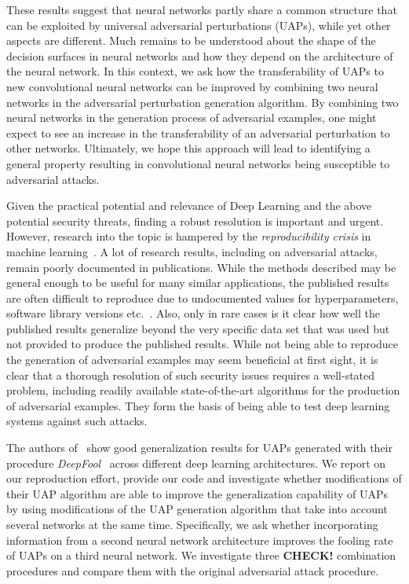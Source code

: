 \documentclass[runningheads]{llncs}
\begin{document}
These results suggest that neural networks partly share a common structure that can be exploited by universal adversarial perturbations (UAPs), while yet other aspects are different. Much remains to be understood about the shape of the decision surfaces in neural networks and how they depend on the architecture of the neural network. In this context, we ask how the transferability of UAPs to new convolutional neural networks can be improved by combining two neural networks in the adversarial perturbation generation algorithm. By combining two neural networks in the generation process of adversarial examples, one might expect to see an increase in the transferability of an adversarial perturbation to other networks. Ultimately, we hope this approach will lead to identifying a general property resulting in convolutional neural networks being susceptible to adversarial attacks.

Given the practical potential and relevance of Deep Learning and the above potential security threats, finding a robust resolution is important and urgent. However, research into the topic is hampered by the \emph{reproducibility crisis} in machine learning~\cite{raff2020quantifying}. A lot of research results, including on adversarial attacks, remain poorly documented in publications. While the methods described may be general enough to be useful for many similar applications, 
the published results are often difficult to reproduce due to undocumented values for hyperparameters, software library versions etc.~\cite{Gundersen2018StateOT}. %
Also, only in rare cases is it clear how well the published results generalize beyond the very specific data set that was used but not provided to produce the published results. While not being able to reproduce the generation of adversarial examples may seem beneficial at first sight, it is clear that a thorough resolution of such security issues requires a well-stated problem, including readily available state-of-the-art algorithms for the production of adversarial examples. They form the basis of being able to test deep learning systems against such attacks. 

The authors of~\cite{moosavidezfooli_universal_2017,moosavi-dezfooli_deepfool_2016} show good generalization results for UAPs generated with their procedure \emph{DeepFool}~\cite{moosavi-dezfooli_deepfool_2016} across different deep learning architectures. We report on our reproduction effort, provide our code and investigate whether modifications of their UAP algorithm are able to improve the generalization capability of UAPs by using modifications of the UAP generation algorithm that take into account several networks at the same time. Specifically, we ask whether incorporating information from a second neural network architecture improves the fooling rate of UAPs on a third neural network. We investigate three {\bf CHECK!} combination procedures and compare them with the original adversarial attack procedure.
\end{document}

